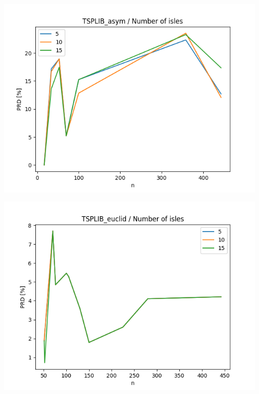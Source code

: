 \documentclass{article}
\begin{document}
\begin{center}
\includegraphics[width=\textwidth, 
                   height = 0.4\textheight, 
                   keepaspectratio]
                  {plots/tsplib_asym_10_isles} 
\end{center}

\begin{center}
\includegraphics[width=\textwidth, 
                   height = 0.4\textheight, 
                   keepaspectratio]
                  {plots/tsplib_euclid_10_isles} 
\end{center}
\end{document}
